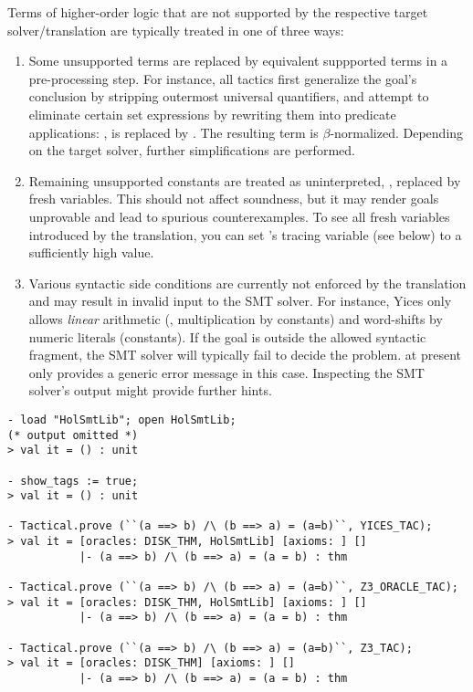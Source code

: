 Terms of higher-order logic that are not supported by the respective
target solver/\allowbreak translation are typically treated in one of
three ways:
\begin{enumerate}
\item Some unsupported terms are replaced by equivalent suppported
  terms in a pre-processing step.  For instance, all tactics first
  generalize the goal's conclusion by stripping outermost universal
  quantifiers, and attempt to eliminate certain set expressions by
  rewriting them into predicate applications: \eg,  is replaced by .  The resulting term is
  $\beta$-normalized.  Depending on the target solver, further
  simplifications are performed.
\item Remaining unsupported constants are treated as uninterpreted,
  \ie, replaced by fresh variables.  This should not affect soundness,
  but it may render goals unprovable and lead to spurious
  counterexamples.  To see all fresh variables introduced by the
  translation, you can set 's tracing variable (see
  below) to a sufficiently high value.
\item Various syntactic side conditions are currently not enforced by
  the translation and may result in invalid input to the SMT solver.
  For instance, Yices only allows \emph{linear} arithmetic (\ie,
  multiplication by constants) and word-shifts by numeric literals
  (constants).  If the goal is outside the allowed syntactic fragment,
  the SMT solver will typically fail to decide the problem.
   at present only provides a generic error message in
  this case.  Inspecting the SMT solver's output might provide further
  hints.
\end{enumerate}

\begin{session}
\begin{verbatim}
- load "HolSmtLib"; open HolSmtLib;
(* output omitted *)
> val it = () : unit

- show_tags := true;
> val it = () : unit

- Tactical.prove (``(a ==> b) /\ (b ==> a) = (a=b)``, YICES_TAC);
> val it = [oracles: DISK_THM, HolSmtLib] [axioms: ] []
           |- (a ==> b) /\ (b ==> a) = (a = b) : thm

- Tactical.prove (``(a ==> b) /\ (b ==> a) = (a=b)``, Z3_ORACLE_TAC);
> val it = [oracles: DISK_THM, HolSmtLib] [axioms: ] []
           |- (a ==> b) /\ (b ==> a) = (a = b) : thm

- Tactical.prove (``(a ==> b) /\ (b ==> a) = (a=b)``, Z3_TAC);
> val it = [oracles: DISK_THM] [axioms: ] []
           |- (a ==> b) /\ (b ==> a) = (a = b) : thm
\end{verbatim}
\end{session}

